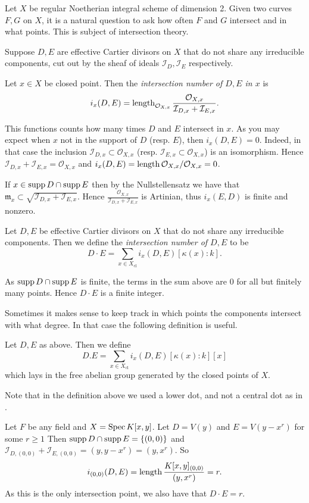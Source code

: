 Let $X$ be regular Noetherian integral scheme of dimension 2. 
Given two curves $F, G$ on $X$, it is a natural question to ask how often $F$ and $G$ intersect and in what points. 
This is subject of intersection theory. 

\begin{definition}
	Suppose $D, E$ are effective Cartier divisors on $X$ that do not share any irreducible components, cut out by the sheaf of ideals $\mathcal{I} _D, \mathcal{I} _E$ respectively.

	Let $x \in X$ be closed point. Then the \emph{intersection number of $D, E$ in $x$} is \[
		i_x(D, E) = \operatorname{length}_{\mathcal{O}_{X, x}} \frac{\mathcal{O}_{X, x}}{\mathcal{I}_{D,x} + \mathcal{I}_{E,x}} 
	.\]  
\end{definition}

This functions counts how many times $ D$ and $E$ intersect in $x$. 
As you may expect when  $x$ not in the support of $D$ (resp. $E$), then $i_x(D, E) = 0$. 
Indeed, in that case the inclusion $\mathcal{I}_{D, x} \subset  \mathcal{O}_{X, x}$ (resp. $\mathcal{I} _{E, x}\subset \mathcal{O}_{X,x}$) is an isomorphism. 
Hence $\mathcal{I}_{D, x} + \mathcal{I} _{E, x} = \mathcal{O}_{X, x}$ and $i_x(D, E) = \operatorname{length} \mathcal{O}_{X, x} /\mathcal{O}_{X, x} = 0$. 

If $x \in \operatorname{supp} D \cap \operatorname{supp} E$ then by the Nullstellensatz we have that $\mathfrak{m} _x \subset  \sqrt{\mathcal{I} _{D, x} + \mathcal{I} _{E, x}} $. 
Hence $\frac{\mathcal{O}_{X, x}}{\mathcal{I}_{D,x} + \mathcal{I}_{E,x}}$ is Artinian, thus $i_x(E, D)$ is finite and nonzero. 

\begin{definition}\label{def:intersection_number_effective}
	Let $D, E$ be effective Cartier divisors on $X$ that do not share any irreducible components.
	Then we define the \emph{intersection number of $D, E$} to be \[
		D\cdot E = \sum_{x \in X_\text{cl} }i_x (D, E)[\kappa(x): k]
	.\] 
\end{definition}
As $\operatorname{supp} D \cap \operatorname{supp} E$ is finite, the terms in the sum above are $0$ for all but finitely many points. Hence $D\cdot E$ is a finite integer. 

Sometimes it makes sense to keep track in which points the components intersect with what degree. In that case the following definition is useful. 
\begin{definition}
	Let $D, E$ as above. 
	Then we define \[
		D.E = \sum_{x \in X_\text{cl} } i_x(D, E)[\kappa(x) :k] [x]
	\] 
	which lays in the free abelian group generated by the closed points of $X$.
\end{definition}
Note that in the definition above we used a lower dot, and not a central dot as in \label{def:intersection_number_effective}.
\begin{example}
	Let $F$ be any field and $X = \operatorname{Spec} K[x, y]$. 
	Let  $D = V(y)$ and $E = V(y - x^r)$ for some $r \ge 1$
	Then  $\operatorname{supp} D \cap \operatorname{supp} E = \{(0, 0)\} $ and $\mathcal{I} _{D, (0,0)} + \mathcal{I} _{E, (0,0)} = (y, y-x^r) = (y, x^r)$.
	So \[
		i_{(0,0)}(D, E) = \operatorname{length} \frac{K[x, y]_{(0, 0)}}{(y, x^{r})} = r
	.\] 
	As this is the only intersection point, we also have that $D\cdot E = r$. 
\end{example}

